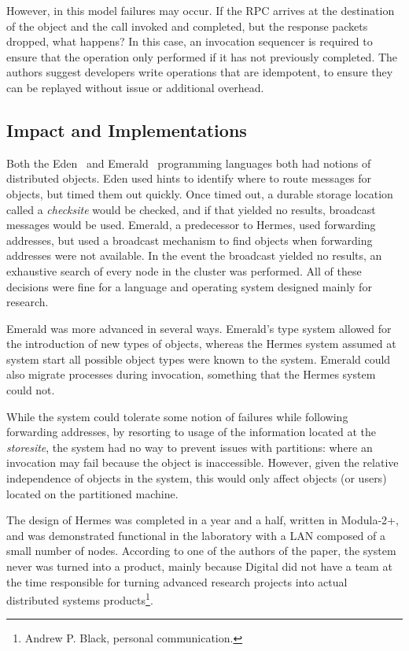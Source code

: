 However, in this model failures may occur.  If the RPC arrives at the destination of the object and the call invoked and completed, but the response packets dropped, what happens?  In this case, an invocation sequencer is required to ensure that the operation only performed if it has not previously completed.  The authors suggest developers write operations that are idempotent, to ensure they can be replayed without issue or additional overhead.

\subsection{Impact and Implementations}

Both the Eden~\cite{Black:1985:SDA:323647.323646} and Emerald~\cite{black2007development} programming languages both had notions of distributed objects.  Eden used hints to identify where to route messages for objects, but timed them out quickly.  Once timed out, a durable storage location called a \textit{checksite} would be checked, and if that yielded no results, broadcast messages would be used.  Emerald, a predecessor to Hermes, used forwarding addresses, but used a broadcast mechanism to find objects when forwarding addresses were not available.  In the event the broadcast yielded no results, an exhaustive search of every node in the cluster was performed.  All of these decisions were fine for a language and operating system designed mainly for research.

Emerald was more advanced in several ways.  Emerald's type system allowed for the introduction of new types of objects, whereas the Hermes system assumed at system start all possible object types were known to the system.  Emerald could also migrate processes during invocation, something that the Hermes system could not.

While the system could tolerate some notion of failures while following forwarding addresses, by resorting to usage of the information located at the \textit{storesite}, the system had no way to prevent issues with partitions: where an invocation may fail because the object is inaccessible.  However, given the relative independence of objects in the system, this would only affect objects (or users) located on the partitioned machine.

The design of Hermes was completed in a year and a half, written in Modula-2+, and was demonstrated functional in the laboratory with a LAN composed of a small number of nodes.  According to one of the authors of the paper, the system never was turned into a product, mainly because Digital did not have a team at the time responsible for turning advanced research projects into actual distributed systems products\footnote{Andrew P. Black, personal communication.}.

